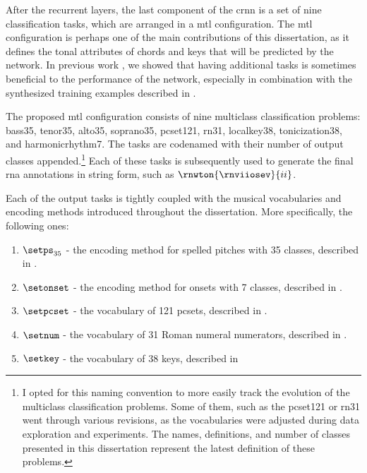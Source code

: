 
After the recurrent layers, the last component of the
\gls{crnn} is a set of nine classification tasks, which are
arranged in a \gls{mtl} configuration. The \gls{mtl}
configuration is perhaps one of the main contributions of
this dissertation, as it defines the tonal attributes of
chords and keys that will be predicted by the network. In
previous work \parencite{napoleslopez2021augmentednet}, we
showed that having additional tasks is sometimes beneficial
to the performance of the network, especially in combination
with the synthesized training examples described in
.

The proposed \gls{mtl} configuration consists of nine
multiclass classification problems: \gls{bass35},
\gls{tenor35}, \gls{alto35}, \gls{soprano35},
\gls{pcset121}, \gls{rn31}, \gls{localkey38},
\gls{tonicization38}, and \gls{harmonicrhythm7}. The tasks
are codenamed with their number of output classes
appended.\footnote{I opted for this naming convention to
more easily track the evolution of the multiclass
classification problems. Some of them, such as the
\gls{pcset121} or \gls{rn31} went through various revisions,
as the vocabularies were adjusted during data exploration
and experiments. The names, definitions, and number of
classes presented in this dissertation represent the latest
definition of these problems.} Each of these tasks is
subsequently used to generate the final \gls{rna}
annotations in string form, such as
$\rnwton{\rnviiosev}{ii}$.

Each of the output tasks is tightly coupled with the musical
vocabularies and encoding methods introduced throughout the
dissertation. More specifically, the following ones:

\begin{enumerate}
    \item $\setps_{35}$ - the encoding method for spelled
    pitches with 35 classes, described in
    .
    \item $\setonset$ - the encoding method for onsets with 7
    classes, described in
    .
    \item $\setpcset$ - the vocabulary of 121 \gls{pcset}s,
    described in .
    \item $\setnum$ - the vocabulary of 31 Roman numeral
    numerators, described in
    .
    \item $\setkey$ - the vocabulary of 38 keys, described in
\end{enumerate}
